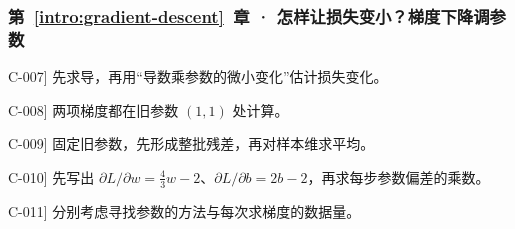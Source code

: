 \subsubsection*{第~\ref*{intro:gradient-descent}~章 · 怎样让损失变小？梯度下降调参数}
\begin{answerhints}
\item[\hyperref[exercise:local-derivative-change]{C-007}] \leavevmode{}\label{hint:local-derivative-change}先求导，再用“导数乘参数的微小变化”估计损失变化。
\item[\hyperref[exercise:synchronous-gradient-step]{C-008}] \leavevmode{}\label{hint:synchronous-gradient-step}两项梯度都在旧参数 $(1,1)$ 处计算。
\item[\hyperref[exercise:mini-batch-gradient-average]{C-009}] \leavevmode{}\label{hint:mini-batch-gradient-average}固定旧参数，先形成整批残差，再对样本维求平均。
\item[\hyperref[exercise:quadratic-gradient-transfer]{C-010}] \leavevmode{}\label{hint:quadratic-gradient-transfer}先写出 $\partial L/\partial w=\tfrac43w-2$、$\partial L/\partial b=2b-2$，再求每步参数偏差的乘数。
\item[\hyperref[exercise:iterative-method-choice]{C-011}] \leavevmode{}\label{hint:iterative-method-choice}分别考虑寻找参数的方法与每次求梯度的数据量。
\end{answerhints}
